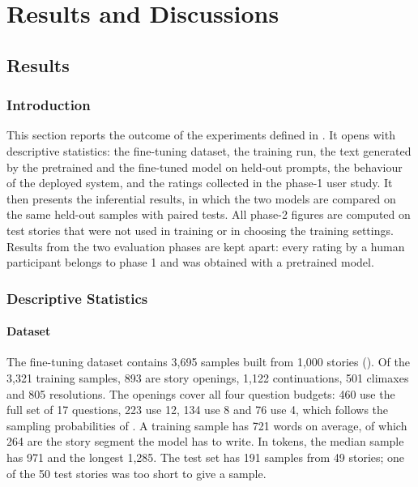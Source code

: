 \chapter{Results and Discussions}
\label{ch:results}

\section{Results}
\label{sec:res-results}

\subsection{Introduction}
\label{sec:res-intro}

This section reports the outcome of the experiments defined in . It opens with descriptive statistics: the fine-tuning dataset, the training run, the text generated by the pretrained and the fine-tuned model on held-out prompts, the behaviour of the deployed system, and the ratings collected in the phase-1 user study. It then presents the inferential results, in which the two models are compared on the same held-out samples with paired tests. All phase-2 figures are computed on test stories that were not used in training or in choosing the training settings. Results from the two evaluation phases are kept apart: every rating by a human participant belongs to phase 1 and was obtained with a pretrained model.

\subsection{Descriptive Statistics}
\label{sec:res-descriptive}

\subsubsection{Dataset}

The fine-tuning dataset contains 3,695 samples built from 1,000 stories (). Of the 3,321 training samples, 893 are story openings, 1,122 continuations, 501 climaxes and 805 resolutions. The openings cover all four question budgets: 460 use the full set of 17 questions, 223 use 12, 134 use 8 and 76 use 4, which follows the sampling probabilities of . A training sample has 721 words on average, of which 264 are the story segment the model has to write. In tokens, the median sample has 971 and the longest 1,285. The test set has 191 samples from 49 stories; one of the 50 test stories was too short to give a sample.


